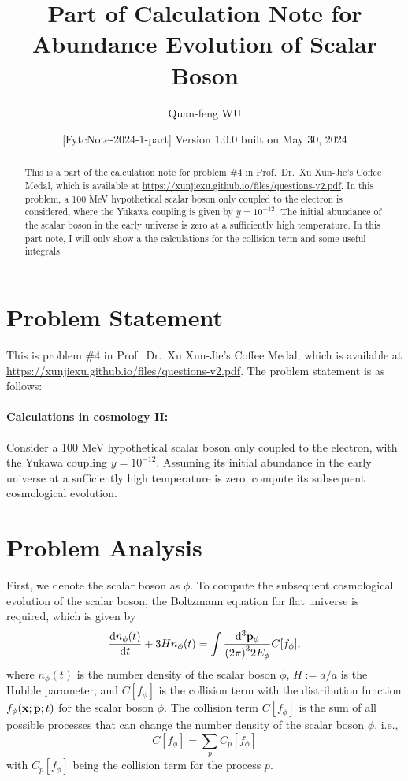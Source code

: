 \documentclass{article}
\title{Part of Calculation Note for Abundance Evolution of Scalar Boson}
\author[a]{Quan-feng WU\email{wuquanfeng@ihep.ac.cn}}
\affil[a]{Institute of High Energy Physics, Chinese Academy of Sciences, Beijing 100049, China}
\affil[b]{University of Chinese Academy of Sciences, Beijing 100049, China}
\date{[FytcNote-2024-1-part] Version 1.0.0 built on May 30, 2024}
\begin{document}
    \maketitle

    \begin{abstract}
        This is a part of the calculation note for problem \#4 in Prof.~Dr.~Xu Xun-Jie's Coffee Medal, which is available at \url{https://xunjiexu.github.io/files/questions-v2.pdf}.
        In this problem, a 100 MeV hypothetical scalar boson only coupled to the electron is considered, where the Yukawa coupling is given by $y = 10^{-12}$.
        The initial abundance of the scalar boson in the early universe is zero at a sufficiently high temperature.
        In this part note, I will only show a the calculations for the collision term and some useful integrals.
    \end{abstract}

    \tableofcontents
    \newpage

    \section{Problem Statement}
        This is problem \#4 in Prof.~Dr.~Xu Xun-Jie's Coffee Medal, which is available at \url{https://xunjiexu.github.io/files/questions-v2.pdf}.
        The problem statement is as follows:

        \paragraph{Calculations in cosmology II:}
        Consider a 100 MeV hypothetical scalar boson only coupled to the electron, with the Yukawa coupling $y = 10^{-12}$. Assuming its initial abundance in the early universe at a sufficiently high temperature is zero, compute its subsequent cosmological evolution.

    \section{Problem Analysis}
        First, we denote the scalar boson as $\phi$.
        To compute the subsequent cosmological evolution of the scalar boson, the Boltzmann equation for flat universe is required, which is given by \cite{Dodelson:2020MC}
        \begin{equation}
            \dv{n_\phi(t)}{t} + 3 H n_\phi(t) = \int \frac{\dd[3]{\vb{p}_\phi}}{\qty(2 \pi)^3 2 E_\phi} C[f_\phi],
            \label{eq:Boltzmann-equation}
        \end{equation}
        where $n_\phi(t)$ is the number density of the scalar boson $\phi$, $H := \dot{a} / a$ is the Hubble parameter, and $C[f_\phi]$ is the collision term with the distribution function $f_\phi(\vb{x}; \vb{p}; t)$ for the scalar boson $\phi$.
        The collision term $C[f_\phi]$ is the sum of all possible processes that can change the number density of the scalar boson $\phi$, i.e.,
        \begin{equation}
            C[f_\phi] = \sum_p C_p[f_\phi]
        \end{equation}
        with $C_p[f_\phi]$ being the collision term for the process $p$.
\end{document}
